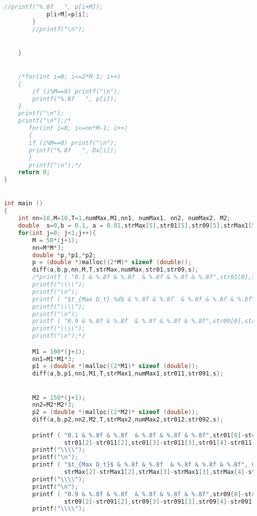 \documentclass{article}
\theoremstyle{remark}
\theoremstyle{definition}
\begin{document}
\begin{lstlisting}[language=C]
            //printf("%.8f   ", p[i+M]);
            p[i+M]=p[i];
        }
        //printf("\n");


    }


    /*for(int i=0; i<=2*M-1; i++)
    {
        if (i%M==0) printf("\n");
        printf("%.8f   ", p[i]);
    }
    printf("\n");
    printf("\n");/*
       for(int i=0; i<=nn*M-1; i++)
       {
       if (i%M==0) printf("\n");
       printf("%.8f   ", Dx[i]);
       }
       printf("\n");*/
    return 0;
}


int main ()
{
    int nn=10,M=10,T=1,numMax,M1,nn1, numMax1, nn2, numMax2, M2;
    double  s=0,b = 0.1, a = 0.01,strMax[5],str01[5],str09[5],strMax1[5],str011[5],str091[5],n2,t2,str012[5],str092[5],n3,t3,strMax2[5];
    for(int j=0; j<1;j++){
        M = 50*(j+1);
        nn=M*M*3;
        double *p,*p1,*p2;
        p = (double *)malloc((2*M)* sizeof (double));
        diff(a,b,p,nn,M,T,strMax,numMax,str01,str09,s);
        /*printf ( "0.1 & %.8f & %.8f  & %.8f & %.8f & %.8f",str01[0],str01[1],str01[2],str01[3],str01[4]);
        printf("\\\\");
        printf("\n");
        printf ( "$t_{Max D_t} %d$ & %.8f & %.8f  & %.8f & %.8f & %.8f",numMax, strMax[0],strMax[1],strMax[2],strMax[3],strMax[4]) ;
        printf("\\\\");
        printf("\n");
        printf ( "0.9 & %.8f & %.8f  & %.8f & %.8f & %.8f",str09[0],str09[1],str09[2],str09[3],str09[4]);
        printf("\\\\");
        printf("\n");*/

        M1 = 100*(j+1);
        nn1=M1*M1*3;
        p1 = (double *)malloc((2*M1)* sizeof (double));
        diff(a,b,p1,nn1,M1,T,strMax1,numMax1,str011,str091,s);


        M2 = 150*(j+1);
        nn2=M2*M2*3;
        p2 = (double *)malloc((2*M2)* sizeof (double));
        diff(a,b,p2,nn2,M2,T,strMax2,numMax2,str012,str092,s);

        printf ( "0.1 & %.8f & %.8f  & %.8f & %.8f & %.8f",str01[0]-str011[0],str01[1]-str011[1],
                 str01[2]-str011[2],str01[3]-str011[3],str01[4]-str011[4]);
        printf("\\\\");
        printf("\n");
        printf ( "$t_{Max D_t}$ & %.8f & %.8f  & %.8f & %.8f & %.8f", strMax[0]-strMax1[0],strMax[1]-strMax1[1],
                 strMax[2]-strMax1[2],strMax[3]-strMax1[3],strMax[4]-strMax1[4]) ;
        printf("\\\\");
        printf("\n");
        printf ( "0.9 & %.8f & %.8f  & %.8f & %.8f & %.8f",str09[0]-str091[0],str09[1]-str091[1],
                 str09[2]-str091[2],str09[3]-str091[3],str09[4]-str091[4]);
        printf("\\\\");


\end{lstlisting}
\end{document}
